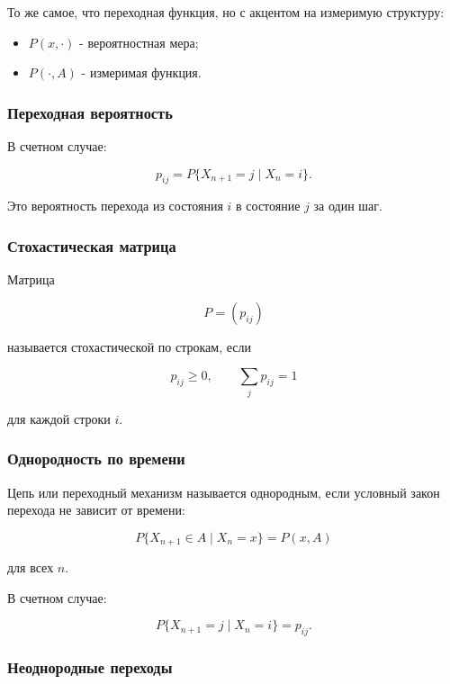 \documentclass[
  11pt,
  a4paper,
]{article}
\providecommand{\tightlist}{%
  \setlength{\itemsep}{0pt}\setlength{\parskip}{0pt}}
\begin{document}
То же самое, что переходная функция, но с акцентом на измеримую
структуру:

\begin{itemize}
\tightlist
\item
  \(P(x,\cdot)\) - вероятностная мера;
\item
  \(P(\cdot,A)\) - измеримая функция.
\end{itemize}

\subsubsection{Переходная
вероятность}\label{ux43fux435ux440ux435ux445ux43eux434ux43dux430ux44f-ux432ux435ux440ux43eux44fux442ux43dux43eux441ux442ux44c}

В счетном случае:

\[
p_{ij}=P\{X_{n+1}=j\mid X_n=i\}.
\]

Это вероятность перехода из состояния \(i\) в состояние \(j\) за один
шаг.

\subsubsection{Стохастическая
матрица}\label{ux441ux442ux43eux445ux430ux441ux442ux438ux447ux435ux441ux43aux430ux44f-ux43cux430ux442ux440ux438ux446ux430}

Матрица

\[
P=(p_{ij})
\]

называется стохастической по строкам, если

\[
p_{ij}\ge0,
\qquad
\sum_jp_{ij}=1
\]

для каждой строки \(i\).

\subsubsection{Однородность по
времени}\label{ux43eux434ux43dux43eux440ux43eux434ux43dux43eux441ux442ux44c-ux43fux43e-ux432ux440ux435ux43cux435ux43dux438}

Цепь или переходный механизм называется однородным, если условный закон
перехода не зависит от времени:

\[
P\{X_{n+1}\in A\mid X_n=x\}=P(x,A)
\]

для всех \(n\).

В счетном случае:

\[
P\{X_{n+1}=j\mid X_n=i\}=p_{ij}.
\]

\subsubsection{Неоднородные
переходы}\label{ux43dux435ux43eux434ux43dux43eux440ux43eux434ux43dux44bux435-ux43fux435ux440ux435ux445ux43eux434ux44b}
\end{document}
